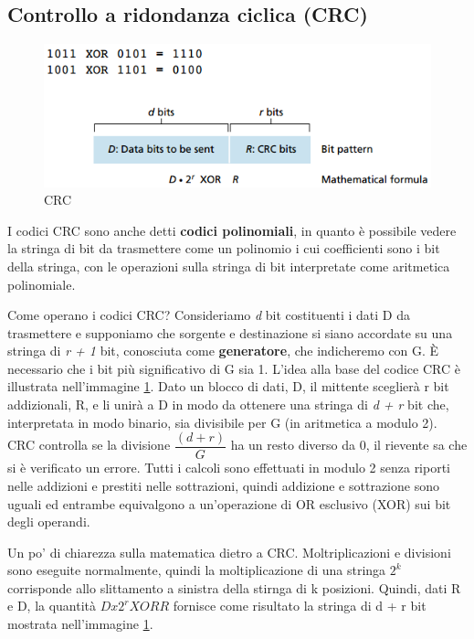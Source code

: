 \documentclass[11pt,a4paper]{book}
\begin{document}
\subsection{Controllo a ridondanza ciclica (CRC)} \label{par: CRC}
\begin{figure}
	\begin{center}
		\includegraphics[scale=0.6]{img/073.png}
		\caption{CRC}
		\label{fig: 073}
	\end{center}
\end{figure}
I codici CRC sono anche detti \textbf{codici polinomiali}, in quanto è possibile vedere la stringa di bit da trasmettere come un polinomio i cui coefficienti sono i bit della stringa, con le operazioni sulla stringa di bit interpretate come aritmetica polinomiale.

Come operano i codici CRC? Consideriamo \emph{d} bit costituenti i dati D da trasmettere e supponiamo che sorgente e destinazione si siano accordate su una stringa di \emph{r + 1} bit, conosciuta come \textbf{generatore}, che indicheremo con G. È necessario che i bit più significativo di G sia 1. L'idea alla base del codice CRC è illustrata nell'immagine \ref{fig: 073}. Dato un blocco di dati, D, il mittente sceglierà r bit addizionali, R,  e li unirà a D in modo da ottenere una stringa di \emph{d + r} bit che, interpretata in modo binario, sia divisibile per G (in aritmetica a modulo 2). CRC controlla se la divisione $\dfrac{(d + r)}{G}$ ha un resto diverso da 0, il rievente sa che si è verificato un errore. Tutti i calcoli sono effettuati in modulo 2 senza riporti nelle addizioni e prestiti nelle sottrazioni, quindi addizione e sottrazione sono uguali ed entrambe equivalgono a un'operazione di OR esclusivo (XOR) sui bit degli operandi.

Un po' di chiarezza sulla matematica dietro a CRC. Moltriplicazioni e divisioni sono eseguite normalmente, quindi la moltiplicazione di una stringa $2^{k}$ corrisponde allo slittamento a sinistra della stirnga di k posizioni. Quindi, dati R e D, la quantità $D x 2^{r} XOR R$ fornisce come risultato la stringa di d + r bit mostrata nell'immagine \ref{fig: 073}.
\end{document}
